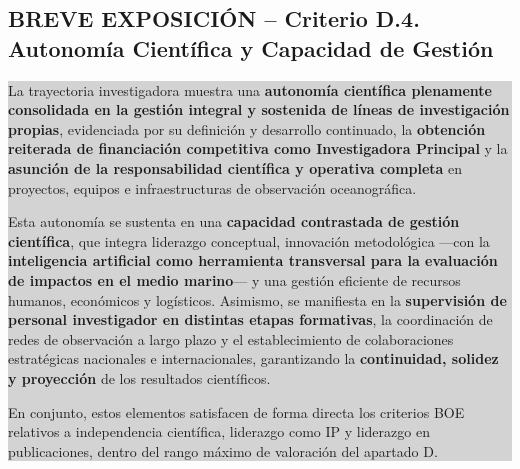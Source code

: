 \documentclass[11pt,a4paper]{article}
\newcommand{\breveexposicion}[2]{
    \subsection*{\color{darkgray}\textbf{BREVE EXPOSICIÓN -- #1}}
    \vspace{0.3em}
    \noindent\colorbox{lightgray}{%
        \begin{minipage}{0.97\textwidth}
        \vspace{0.5em}
        \color{darkgray}
        #2
        \vspace{0.5em}
        \end{minipage}
    }
    \vspace{1em}
}
\begin{document}
\breveexposicion{Criterio D.4. Autonomía Científica y Capacidad de Gestión}{
La trayectoria investigadora muestra una \textbf{autonomía científica plenamente consolidada en la gestión integral y sostenida de líneas de investigación propias}, evidenciada por su definición y desarrollo continuado, la \textbf{obtención reiterada de financiación competitiva como Investigadora Principal} y la \textbf{asunción de la responsabilidad científica y operativa completa} en proyectos, equipos e infraestructuras de observación oceanográfica.

Esta autonomía se sustenta en una \textbf{capacidad contrastada de gestión científica}, que integra liderazgo conceptual, innovación metodológica —con la \textbf{inteligencia artificial como herramienta transversal para la evaluación de impactos en el medio marino}— y una gestión eficiente de recursos humanos, económicos y logísticos. Asimismo, se manifiesta en la \textbf{supervisión de personal investigador en distintas etapas formativas}, la coordinación de redes de observación a largo plazo y el establecimiento de colaboraciones estratégicas nacionales e internacionales, garantizando la \textbf{continuidad, solidez y proyección} de los resultados científicos.

En conjunto, estos elementos satisfacen de forma directa los criterios BOE relativos a independencia científica, liderazgo como IP y liderazgo en publicaciones, dentro del rango máximo de valoración del apartado D.

}
\end{document}
